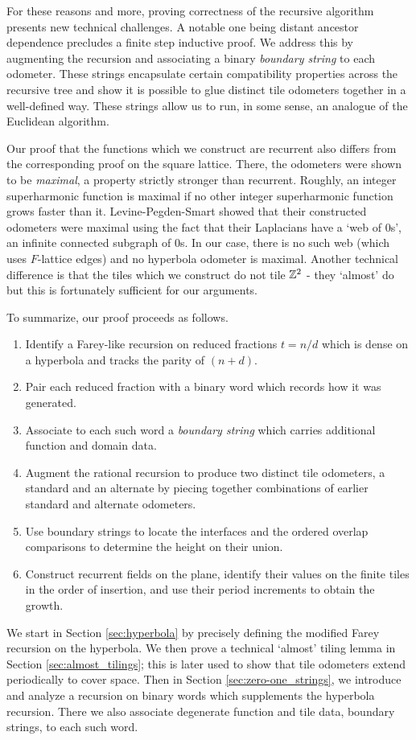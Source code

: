 \documentclass[12pt]{amsart}
\begin{document}
For these reasons and more, proving correctness of the recursive algorithm presents new technical challenges. 
A notable one being distant ancestor dependence precludes a finite step inductive proof. 
We address this by augmenting the recursion and associating a binary {\it boundary string} to each odometer.
These strings encapsulate certain compatibility properties across the recursive tree and show it is possible to glue 
distinct tile odometers together in a well-defined way.   These strings allow us to run, in some sense, an analogue of the Euclidean algorithm. 


Our proof that the functions which we construct are recurrent also differs from the 
corresponding proof on the square lattice. There, the odometers were shown to be {\it maximal}, a property
strictly stronger than recurrent. Roughly, an integer superharmonic function is maximal if no other integer superharmonic function grows faster than it. Levine-Pegden-Smart showed that their constructed odometers were maximal using the fact that their Laplacians have a `web of 0s', an infinite connected subgraph of 0s. In our case, there is no such web (which uses $F$-lattice edges)
and no hyperbola odometer is maximal. Another technical difference is that the tiles which we construct do not tile $\mathbb{Z}^2$ - they `almost' do but this is fortunately sufficient for our arguments. 

To summarize, our proof proceeds as follows. 
\begin{enumerate}
\item Identify a Farey-like recursion on reduced fractions $t = n/d$ which is dense on a hyperbola and tracks the parity of $(n+d)$. 
\item Pair each reduced fraction with a binary word which records how it was generated.
\item Associate to each such word a {\it boundary string} which carries additional function and domain data.
\item Augment the rational recursion to produce two distinct tile odometers, a standard and an alternate
by piecing together combinations of earlier standard and alternate odometers.
\item Use boundary strings to locate the interfaces and the ordered overlap comparisons to determine the height on their union. 
\item Construct recurrent fields on the plane, identify their values on the finite tiles in the order of insertion, and use their period increments to obtain the growth.  
\end{enumerate}
We start in Section  \ref{sec:hyperbola} by precisely defining the modified Farey recursion on the hyperbola. 
We then prove a technical `almost' tiling lemma in Section \ref{sec:almost_tilings}; this is 
later used to show that tile odometers extend periodically to cover space. 
Then in Section \ref{sec:zero-one_strings}, we introduce and analyze a recursion on binary words
which supplements the hyperbola recursion.  There we also associate degenerate function and tile data, boundary strings, to each such word.
\end{document}
